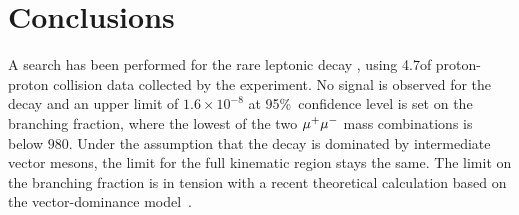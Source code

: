 \section{Conclusions}
\label{sec:conclusions}

A search has been performed for the rare leptonic decay \Bmumumu, using
4.7\invfb of proton-proton collision data collected by the \lhcb experiment.
No signal is observed for the \Bmumumu decay and an upper limit of 
$1.6\times 10^{-8}$ at 95\%~confidence level is set on the branching
fraction, where the lowest of the two ${\mu^+\mu^-}$ mass combinations is below
$980$\mevcc. Under the assumption that the decay is dominated by
intermediate vector mesons, the limit for the full kinematic region stays
the same. The limit on the branching fraction is in tension with a recent
theoretical calculation based on the vector-dominance
model~\cite{Danilina:2018uzr}.
